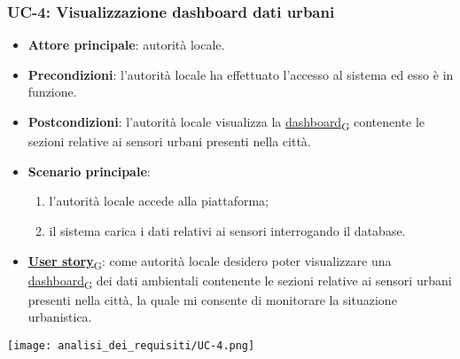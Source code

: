 \subsubsection{UC-4: Visualizzazione dashboard dati urbani}
\begin{itemize}
	\item \textbf{Attore principale}: autorità locale.
	\item \textbf{Precondizioni}: l'autorità locale ha effettuato l'accesso al sistema ed esso è in funzione.
	\item \textbf{Postcondizioni}: l'autorità locale visualizza la \href{https://7last.github.io/docs/pb/documentazione-interna/glossario\#dashboard}{dashboard\textsubscript{G}} contenente le sezioni relative ai sensori urbani presenti nella città.
	\item \textbf{Scenario principale}:
	      \begin{enumerate}
		      \item l'autorità locale accede alla piattaforma;
		      \item il sistema carica i dati relativi ai sensori interrogando il database.
	      \end{enumerate}
	\item \href{https://7last.github.io/docs/pb/documentazione-interna/glossario\#user-story}{\textbf{User story}\textsubscript{G}}: come autorità locale desidero poter visualizzare una \href{https://7last.github.io/docs/pb/documentazione-interna/glossario\#dashboard}{dashboard\textsubscript{G}} dei dati ambientali contenente le sezioni relative ai sensori urbani presenti nella città, la quale mi consente di monitorare la situazione urbanistica.
\end{itemize}
\begin{center}
	\texttt{[image: analisi\_dei\_requisiti/UC-4.png]}
\end{center}

